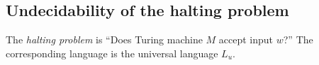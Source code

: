 \subsection{Undecidability of the halting problem}
The \emph{halting problem} is ``Does Turing machine $M$ accept input $w$?''
The corresponding language is the universal language $L_u$.
